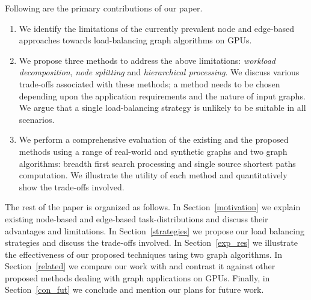 Following are the primary contributions of our paper.
\begin{enumerate}
\item We identify the limitations of the currently prevalent node and edge-based approaches towards load-balancing graph algorithms on GPUs.
\item We propose three methods to address the above limitations: \textit{workload decomposition}, \textit{node splitting} and \textit{hierarchical processing}. We discuss various trade-offs associated with these methods; a method needs to be chosen depending upon the application requirements and the nature of input graphs. We argue that a single load-balancing strategy is unlikely to be suitable in all scenarios.
\item We perform a comprehensive evaluation of the existing and the proposed methods using a range of real-world and synthetic graphs and two graph algorithms: breadth first search processing and single source shortest paths computation. We illustrate the utility of each method and quantitatively show the trade-offs involved.
\end{enumerate}

The rest of the paper is organized as follows.
In Section~\ref{motivation} we explain existing node-based and edge-based task-distributions and discuss their advantages and limitations.
In Section~\ref{strategies} we propose our load balancing strategies and discuss the trade-offs involved.
In Section~\ref{exp_res} we illustrate the effectiveness of our proposed techniques using two graph algorithms.
In Section~\ref{related} we compare our work with and contrast it against other proposed methods dealing with graph applications on GPUs. 
Finally, in Section~\ref{con_fut} we conclude and mention our plans for future work.


